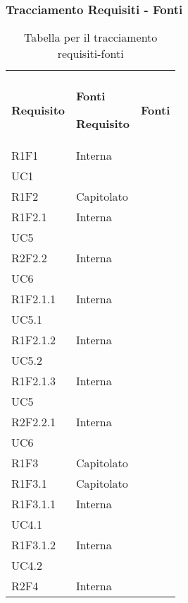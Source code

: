 \newpage
\subsubsection{Tracciamento Requisiti - Fonti}

\renewcommand{\arraystretch}{2.2}

\begin{longtable}{|C{6.5cm}|C{6.5cm}|}
	\caption{Tabella per il tracciamento requisiti-fonti}\\
	\textbf{Requisito} & \textbf{Fonti}
	\endfirsthead

	\hline

	\textbf{Requisito} & \textbf{Fonti}
	\tabularnewline
	\endhead

	R1F1 & \centering Interna \\ UC1 \tabularnewline

	R1F2 & Capitolato \\

	R1F2.1 & \centering Interna \\ UC5 \tabularnewline

	R2F2.2 & \centering Interna \\ UC6 \tabularnewline


	R1F2.1.1 &   \centering Interna \\ UC5.1 \tabularnewline

	R1F2.1.2 &  \centering Interna \\ UC5.2 \tabularnewline

	R1F2.1.3 &  \centering Interna \\ UC5 \tabularnewline

	R2F2.2.1 &  \centering Interna \\ UC6 \tabularnewline

	R1F3 & Capitolato \\

	R1F3.1 & Capitolato \\

	R1F3.1.1 &  \centering Interna \\ UC4.1 \tabularnewline

	R1F3.1.2 &  \centering Interna \\ UC4.2 \tabularnewline

	R2F4 &  Interna \\


\end{longtable}

